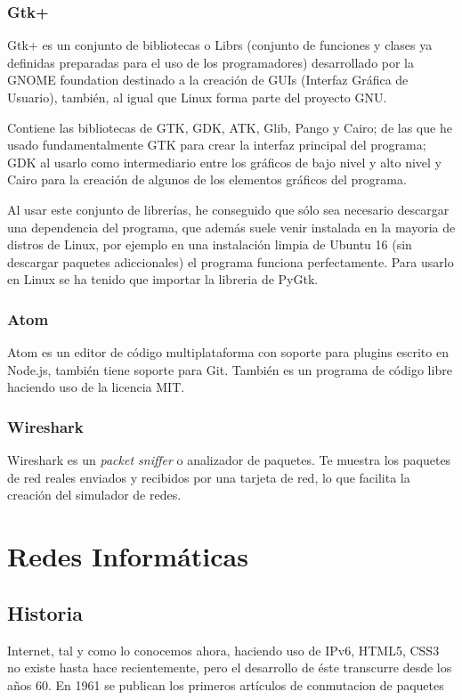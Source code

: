 \documentclass[a4paper, 11pt, twoside]{report} %
\begin{document}
\subsection{Gtk+}
Gtk+ es un conjunto de bibliotecas o \glspl{Libr} (conjunto de funciones y clases ya definidas preparadas para el uso de los programadores) desarrollado por la GNOME foundation destinado a la creación de GUIs (Interfaz Gráfica de Usuario), también, al igual que Linux forma parte del proyecto GNU.

Contiene las bibliotecas de GTK, GDK, ATK, Glib, Pango y Cairo; de las que he usado fundamentalmente GTK para crear la interfaz principal del programa; GDK al usarlo como intermediario entre los gráficos de bajo nivel y alto nivel y Cairo para la creación de algunos de los elementos gráficos del programa.

Al usar este conjunto de librerías, he conseguido que sólo sea necesario descargar una dependencia del programa, que además suele venir instalada en la mayoria de distros de Linux, por ejemplo en una instalación limpia de Ubuntu 16 (sin descargar paquetes adiccionales) el programa funciona perfectamente. Para usarlo en Linux se ha tenido que importar la libreria de PyGtk.
\subsection{Atom}
Atom es un editor de código multiplataforma con soporte para plugins escrito en Node.js, también tiene soporte para Git. También es un programa de código libre haciendo uso de la licencia MIT.

\subsection{Wireshark}
Wireshark es un \textit{packet sniffer} o analizador de paquetes. Te muestra los paquetes de red reales enviados y recibidos por una tarjeta de red, lo que facilita la creación del simulador de redes.

\chapter{Redes Informáticas}

\section*{Historia}
Internet, tal y como lo conocemos ahora, haciendo uso de IPv6, HTML5, CSS3 no existe hasta hace recientemente, pero el desarrollo de éste transcurre desde los años 60. En 1961 se publican los primeros artículos de \gls{conmutacion de paquetes}
\end{document}

